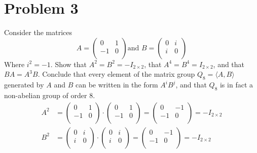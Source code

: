 \documentclass[a4paper,12pt]{extarticle}
\theoremstyle{definition}
\begin{document}
        \section*{Problem 3}
        Consider the matrices $$A=\begin{pmatrix}
        0 & 1\\
        -1 & 0\\
        \end{pmatrix}\text{and }B=\begin{pmatrix}
        0 & i\\
        i & 0\\
        \end{pmatrix}$$ Where $i^2=-1$. Show that $A^2=B^2=-I_{2\times2}$, that $A^4=B^4=I_{2\times2}$, and that $BA=A^3B$. Conclude that every element of the matrix group $Q_8=\langle A,B\rangle$ generated by $A$ and $B$ can be written in the form $A^iB^j$, and that $Q_8$ is in fact a non-abelian group of order 8.\myskip\begin{align*}
            A^2&=\begin{pmatrix}
        0 & 1\\
        -1 & 0\\
        \end{pmatrix}\cdot\begin{pmatrix}
        0 & 1\\
        -1 & 0\\
        \end{pmatrix}=\begin{pmatrix}
        0 & -1\\
        -1 & 0\\
        \end{pmatrix}=-I_{2\times2}\\
        B^2&=\begin{pmatrix}
        0 & i\\
        i & 0\\
        \end{pmatrix}\cdot\begin{pmatrix}
        0 & i\\
        i & 0\\
        \end{pmatrix}=\begin{pmatrix}
        0 & -1\\
        -1 & 0\\
        \end{pmatrix}=-I_{2\times2}
        \end{align*}
\end{document}
